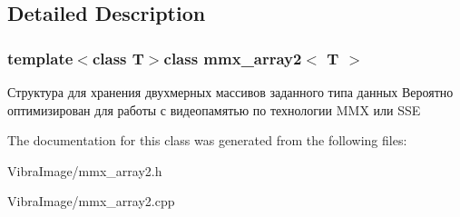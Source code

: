 \subsection{Detailed Description}
\subsubsection*{template$<$class T$>$class mmx\+\_\+array2$<$ T $>$}

Структура для хранения двухмерных массивов заданного типа данных Вероятно оптимизирован для работы с видеопамятью по технологии M\+M\+X или S\+S\+E 



The documentation for this class was generated from the following files\+:\begin{DoxyCompactItemize}
\item 
Vibra\+Image/mmx\+\_\+array2.\+h\item 
Vibra\+Image/mmx\+\_\+array2.\+cpp\end{DoxyCompactItemize}
